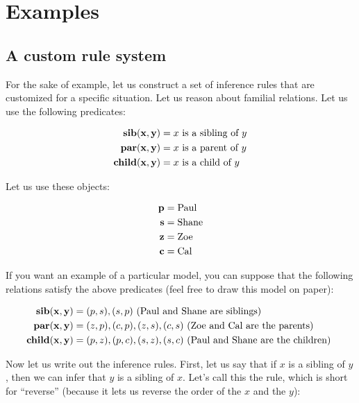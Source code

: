 \documentclass[../../../main.tex]{subfiles}
\begin{document}
\chapter{Examples}


\section{A custom rule system}

For the sake of example, let us construct a set of inference rules that are customized for a specific situation. Let us reason about familial relations. Let us use the following predicates:

\begin{align*}
  \mathbf{sib(x, y)} &= \text{$x$ is a sibling of $y$} \\
  \mathbf{par(x, y)} &= \text{$x$ is a parent of $y$} \\
  \mathbf{child(x, y)} &= \text{$x$ is a child of $y$} \\
\end{align*}

\noindent
Let us use these objects:

\begin{align*}
  \mathbf{p} &= \text{Paul} \\
  \mathbf{s} &= \text{Shane} \\
  \mathbf{z} &= \text{Zoe} \\
  \mathbf{c} &= \text{Cal}
\end{align*}

\noindent
If you want an example of a particular model, you can suppose that the following relations satisfy the above predicates (feel free to draw this model on paper):

\begin{align*}
  \mathbf{sib(x, y)} &= (p, s), (s, p) \text{ (Paul and Shane are siblings)} \\
  \mathbf{par(x, y)} &= (z, p), (c, p), (z, s), (c, s) \text{ (Zoe and Cal are the parents) } \\
  \mathbf{child(x, y)} &= (p, z), (p, c), (s, z), (s, c) \text{ (Paul and Shane are the children) }
\end{align*}

\noindent
Now let us write out the inference rules. First, let us say that if $x$ is a sibling of $y$, then we can infer that $y$ is a sibling of $x$. Let's call this the  rule, which is short for ``reverse'' (because it lets us reverse the order of the $x$ and the $y$):
\end{document}
